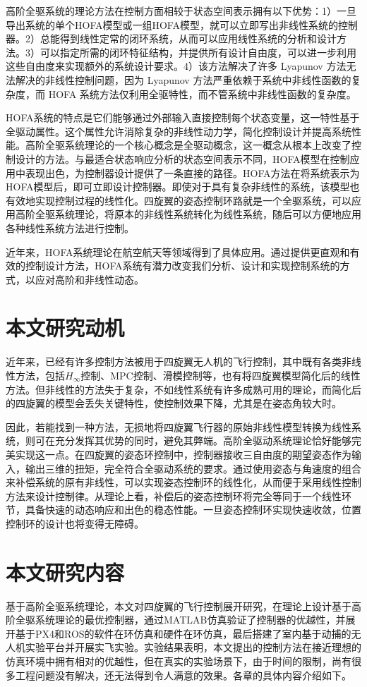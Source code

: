 高阶全驱系统的理论方法在控制方面相较于状态空间表示拥有以下优势：1）一旦导出系统的单个HOFA模型或一组HOFA模型，就可以立即写出非线性系统的控制器。2）总能得到线性定常的闭环系统，从而可以应用线性系统的分析和设计方法。3）可以指定所需的闭环特征结构，并提供所有设计自由度，可以进一步利用这些自由度来实现额外的系统设计要求。4）该方法解决了许多 Lyapunov 方法无法解决的非线性控制问题，因为 Lyapunov 方法严重依赖于系统中非线性函数的复杂度，而 HOFA 系统方法仅利用全驱特性，而不管系统中非线性函数的复杂度。

HOFA系统的特点是它们能够通过外部输入直接控制每个状态变量，这一特性基于全驱动属性。这个属性允许消除复杂的非线性动力学，简化控制设计并提高系统性能。高阶全驱系统理论的一个核心概念是全驱动概念，这一概念从根本上改变了控制设计的方法。与最适合状态响应分析的状态空间表示不同，HOFA模型在控制应用中表现出色，为控制器设计提供了一条直接的路径。HOFA方法在将系统表示为HOFA模型后，即可立即设计控制器。即使对于具有复杂非线性的系统，该模型也有效地实现控制过程的线性化。四旋翼的姿态控制环路就是一个全驱系统，可以应用高阶全驱系统理论，将原本的非线性系统转化为线性系统，随后可以方便地应用各种线性系统方法进行控制。

近年来，HOFA系统理论在航空航天等领域得到了具体应用\cite{hofa}\cite{hofa1}。通过提供更直观和有效的控制设计方法，HOFA系统有潜力改变我们分析、设计和实现控制系统的方式，以应对高阶和非线性动态。
\section{本文研究动机}
近年来，已经有许多控制方法被用于四旋翼无人机的飞行控制，其中既有各类非线性方法，包括$H_\infty$控制\cite{H}、MPC控制\cite{MPC}、滑模控制\cite{sliding}等，也有将四旋翼模型简化后的线性方法\cite{boua2007}。但非线性的方法失于复杂，不如线性系统有许多成熟可用的理论，而简化后的四旋翼的模型会丢失关键特性，使控制效果下降，尤其是在姿态角较大时。

因此，若能找到一种方法，无损地将四旋翼飞行器的原始非线性模型转换为线性系统，则可在充分发挥其优势的同时，避免其弊端。高阶全驱动系统理论恰好能够完美实现这一点。在四旋翼的姿态环控制中，控制器接收三自由度的期望姿态作为输入，输出三维的扭矩，完全符合全驱动系统的要求。通过使用姿态与角速度的组合来补偿系统的原有非线性，可以实现姿态控制环的线性化，从而便于采用线性控制方法来设计控制律。从理论上看，补偿后的姿态控制环将完全等同于一个线性环节，具备快速的动态响应和出色的稳态性能。一旦姿态控制环实现快速收敛，位置控制环的设计也将变得无障碍。
\section{本文研究内容}
基于高阶全驱系统理论，本文对四旋翼的飞行控制展开研究，在理论上设计基于高阶全驱系统理论的最优控制器，通过MATLAB仿真验证了控制器的优越性，并展开基于PX4和ROS的软件在环仿真和硬件在环仿真，最后搭建了室内基于动捕的无人机实验平台并开展实飞实验。实验结果表明，本文提出的控制方法在接近理想的仿真环境中拥有相对的优越性，但在真实的实验场景下，由于时间的限制，尚有很多工程问题没有解决，还无法得到令人满意的效果。各章的具体内容介绍如下。

